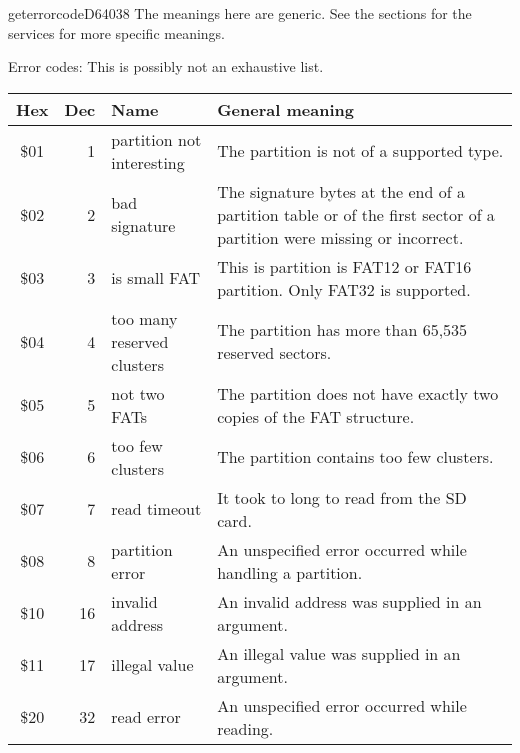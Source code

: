 \begin{hyppotrap}{geterrorcode}{D640}{38}
  The meanings here are generic. See the sections for the services for more
  specific meanings.
\item [Error codes:] This is possibly not an exhaustive list.
{
  \begin{longtable}{|c|r|l|p{8cm}|}
    \hline
    \textbf{Hex} & \textbf{Dec} & \textbf{Name} & \textbf{General meaning}\\
    \hline
    \endhead
    \index{Hyppo Error Codes!\$01}
    \$01 & 1 & \makecell[tl]{partition not \\ interesting} &
    The partition is not of a supported type.
    \\\hline
    \index{Hyppo Error Codes!\$02}
    \$02 & 2 & bad signature &
    The signature bytes at the end of a partition table or of the first sector
    of a partition were missing or incorrect.
    \\\hline
    \index{Hyppo Error Codes!\$03}
    \$03 & 3 & is small FAT &
    This is partition is FAT12 or FAT16 partition. Only FAT32 is supported.
    \\\hline
    \index{Hyppo Error Codes!\$04}
    \$04 & 4 & \makecell[tl]{too many reserved\\clusters} &
    The partition has more than 65,535 reserved sectors.
    \\\hline
    \index{Hyppo Error Codes!\$05}
    \$05 & 5 & not two FATs &
    The partition does not have exactly two copies of the FAT structure.
    \\\hline
    \index{Hyppo Error Codes!\$06}
    \$06 & 6 & too few clusters &
    The partition contains too few clusters.
    \\\hline
    \index{Hyppo Error Codes!\$07}
    \$07 & 7 & read timeout &
    It took to long to read from the SD card.
    \\\hline
    \index{Hyppo Error Codes!\$08}
    \$08 & 8 & partition error &
    An unspecified error occurred while handling a partition.
    \\\hline
    \index{Hyppo Error Codes!\$10}
    \$10 & 16 & invalid address &
    An invalid address was supplied in an argument.
    \\\hline
    \index{Hyppo Error Codes!\$11}
    \$11 & 17 & illegal value &
    An illegal value was supplied in an argument.
    \\\hline
    \index{Hyppo Error Codes!\$20}
    \$20 & 32 & read error &
    An unspecified error occurred while reading.

\end{longtable}}
\end{hyppotrap}
